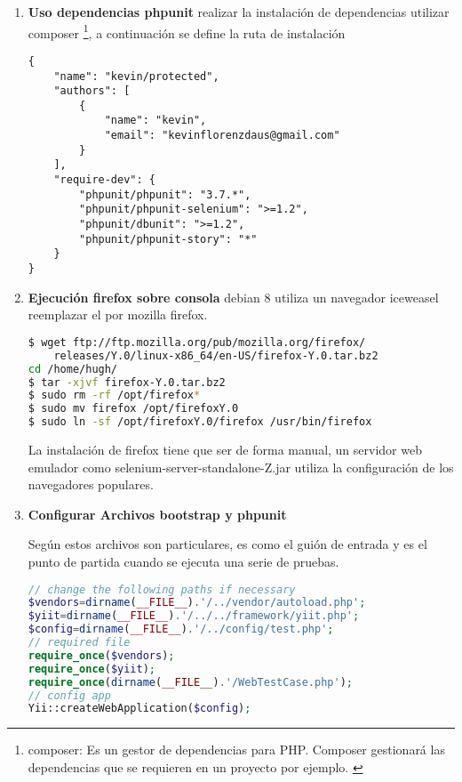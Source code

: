 \begin{enumerate}

\item \textbf{Uso dependencias phpunit} realizar la instalación de
dependencias utilizar composer \footnote{composer: Es un gestor de
dependencias para PHP. Composer gestionará las dependencias que se requieren
en un proyecto por ejemplo. \cite{composer}}, a continuación se define la
ruta de instalación 

\begin{lstlisting}[caption={Dependencias de phpunit.}]
{
    "name": "kevin/protected",
    "authors": [
        {
            "name": "kevin",
            "email": "kevinflorenzdaus@gmail.com"
        }
    ],
    "require-dev": {
        "phpunit/phpunit": "3.7.*",
        "phpunit/phpunit-selenium": ">=1.2",
        "phpunit/dbunit": ">=1.2",
        "phpunit/phpunit-story": "*"
    }
}
\end{lstlisting}

\item \textbf{Ejecución firefox sobre consola} debian 8 utiliza un navegador
iceweasel reemplazar el por mozilla firefox.

\begin{lstlisting}[language=bash, caption={Instrucciones de instalación para Mozilla Firefox.}]
$ wget ftp://ftp.mozilla.org/pub/mozilla.org/firefox/
	releases/Y.0/linux-x86_64/en-US/firefox-Y.0.tar.bz2
cd /home/hugh/
$ tar -xjvf firefox-Y.0.tar.bz2
$ sudo rm -rf /opt/firefox*
$ sudo mv firefox /opt/firefoxY.0
$ sudo ln -sf /opt/firefoxY.0/firefox /usr/bin/firefox
\end{lstlisting}

La instalación de firefox tiene que ser de forma manual, un servidor web
emulador como selenium-server-standalone-Z.jar utiliza la configuración de los
navegadores populares.


\item \textbf{Configurar Archivos bootstrap y phpunit}

Según \cite{testing} estos archivos son particulares, es como el guión de
entrada y es el punto de partida cuando se ejecuta una serie de pruebas. 

\begin{lstlisting}[language=PHP, caption={Estrucuta de configuración archivo bootstrap.php.}]
// change the following paths if necessary
$vendors=dirname(__FILE__).'/../vendor/autoload.php';
$yiit=dirname(__FILE__).'/../../framework/yiit.php';
$config=dirname(__FILE__).'/../config/test.php';
// required file
require_once($vendors);
require_once($yiit);
require_once(dirname(__FILE__).'/WebTestCase.php');
// config app
Yii::createWebApplication($config);
\end{lstlisting}


\end{enumerate}
